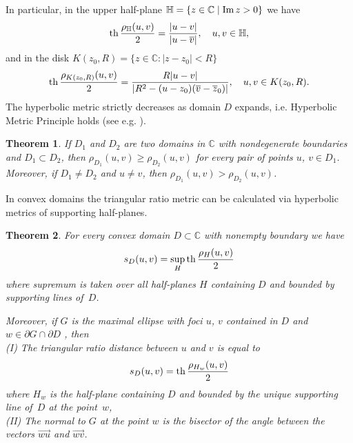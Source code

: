 \documentclass[12pt,a4paper]{amsart}
\newtheorem{theorem}{Theorem}
\def\Im{\mathop{\rm Im}\nolimits}
\def\th{\mathop{\rm th}\nolimits}
\begin{document}
In particular, in the upper half-plane $\mathbb{H}=\{z\in \mathbb{C}\mid \Im z>0\}$ we have
$$
\th\frac{\rho_\mathbb{H}(u,v)}{2}=\frac{|u-v|}{|u-\overline{v}|}, \quad u,v\in \mathbb{H},
$$
and in the disk $K(z_0,R)=\{z\in \mathbb{C} : |z-z_0|<R\}$
\begin{equation}\label{K}
\th\frac{\rho_{K(z_0,R)}(u,v)}{2}=\frac{R|u-v|}{|R^2-(u-z_0)(\overline{v}-\overline{z}_0)|}, \quad u,v\in K(z_0,R).
\end{equation}
The hyperbolic metric strictly decreases as domain $D$ expands, i.e.  Hyperbolic Metric Principle holds   (see e.g. \cite[ch.~VIII, \S~2]{goluzin}).

\begin{theorem} \label{princ}
If $D_1$ and $D_2$ are two domains in $\mathbb{C}$ with nondegenerate boundaries and $D_1\subset D_2$, then $\rho_{D_1}(u,v)\ge \rho_{D_2}(u,v)$ for every pair of points $u$, $v\in D_1$. Moreover, if  $D_1\not=D_2$ and $u\neq v$, then $\rho_{D_1}(u,v)> \rho_{D_2}(u,v)$.
\end{theorem}

In convex domains the triangular ratio metric can be calculated via hyperbolic metrics of supporting half-planes.


\begin{theorem} \label{supp}
For every convex domain $D\subset \mathbb{C}$ with nonempty boundary
we have
\begin{equation}\label{convex}
s_D(u,v)=\sup_{H} \th\frac{\rho_{H}(u,v)}{2}
\end{equation}
where supremum is taken over all half-planes $H$ containing $D$ and bounded by supporting lines of~$D$.

Moreover, if $G$ is the maximal ellipse with foci $u$, $v$ contained in $D$ and $w\in \partial G\cap \partial D$ , then \\
(I) The triangular ratio distance between $u$ and $v$ is equal to
$$
s_D(u,v)=\th\frac{\rho_{H_w}(u,v)}{2}
$$
where $H_w$ is the  half-plane containing $D$ and bounded by the unique supporting line of~$D$ at the point~$w$,\\
(II) The normal to $G$ at the point $w$ is the bisector of the angle between the vectors $\overrightarrow{wu}$ and $\overrightarrow{wv}$.
\end{theorem}
\end{document}
